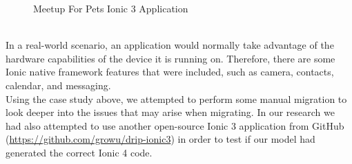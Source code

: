 \documentclass[conference]{IEEEtran}
\begin{document}
\begin{figure}[!htb]
    \caption{Meetup For Pets Ionic 3 Application}%
    \label{fig:meetupIonic}%
\end{figure}
\\ In a real-world scenario, an application would normally take advantage of the hardware capabilities of the device it is running on.
Therefore, there are some Ionic native framework features that were included, such as camera, contacts, calendar, and messaging.
\\ Using the case study above, we attempted to perform some manual migration to look deeper into the issues that may arise when migrating. In our research we had also attempted to use another open-source Ionic 3 application from GitHub (\url{https://github.com/growu/drip-ionic3}) in order to test if our model
had generated the correct Ionic 4 code.
\end{document}
